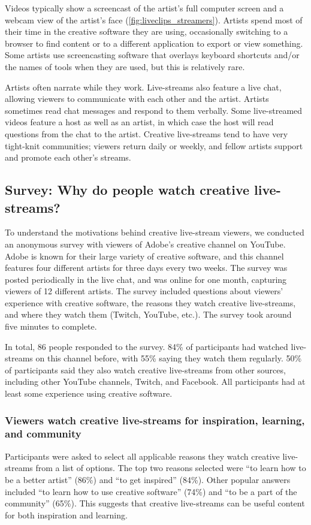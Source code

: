 Videos typically show a screencast of the artist's full computer screen and a webcam view of the artist's face (\autoref{fig:liveclips_streamers}). Artists spend most of their time in the creative software they are using, occasionally switching to a browser to find content or to a different application to export or view something. Some artists use screencasting software that overlays keyboard shortcuts and/or the names of tools when they are used, but this is relatively rare.

Artists often narrate while they work. Live-streams also feature a live chat, allowing viewers to communicate with each other and the artist. Artists sometimes read chat messages and respond to them verbally. Some live-streamed videos feature a host as well as an artist, in which case the host will read questions from the chat to the artist. Creative live-streams tend to have very tight-knit communities; viewers return daily or weekly, and fellow artists support and promote each other's streams.

\subsection{Survey: Why do people watch creative live-streams?}
To understand the motivations behind creative live-stream viewers, we conducted an anonymous survey with viewers of Adobe's creative channel on YouTube. Adobe is known for their large variety of creative software, and this channel features four different artists for three days every two weeks. The survey was posted periodically in the live chat, and was online for one month, capturing viewers of 12 different artists. The survey included questions about viewers' experience with creative software, the reasons they watch creative live-streams, and where they watch them (Twitch, YouTube, etc.). The survey took around five minutes to complete.

In total, 86 people responded to the survey. 84\% of participants had watched live-streams on this channel before, with 55\% saying they watch them regularly. 50\% of participants said they also watch creative live-streams from other sources, including other YouTube channels, Twitch, and Facebook. All participants had at least some experience using creative software.

\subsubsection{Viewers watch creative live-streams for inspiration, learning, and community}
Participants were asked to select all applicable reasons they watch creative live-streams from a list of options. The top two reasons selected were ``to learn how to be a better artist'' (86\%) and ``to get inspired'' (84\%). Other popular answers included ``to learn how to use creative software'' (74\%) and ``to be a part of the community'' (65\%). This suggests that creative live-streams can be useful content for both inspiration and learning.

